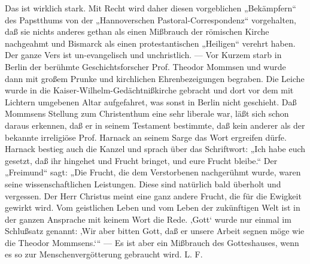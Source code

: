 Das ist wirklich stark. Mit Recht wird daher diesen vorgeblichen „Bekämpfern“ des Papstthums von der „Hannoverschen Pastoral-Correspondenz“ vorgehalten, daß sie nichts anderes gethan als einen Mißbrauch der römischen Kirche nachgeahmt und Bismarck als einen protestantischen „Heiligen“ verehrt haben. Der ganze Vers ist un-evangelisch und unchristlich. — Vor Kurzem starb in Berlin der berühmte Geschichtsforscher Prof. Theodor Mommsen und wurde dann mit großem Prunke und kirchlichen Ehrenbezeigungen begraben. Die Leiche wurde in die Kaiser-Wilhelm-Gedächtnißkirche gebracht und dort vor dem mit Lichtern umgebenen Altar aufgefahret, was sonst in Berlin nicht geschieht. Daß Mommsens Stellung zum Christenthum eine sehr liberale war, läßt sich schon daraus erkennen, daß er in seinem Testament bestimmte, daß kein anderer als der bekannte irreligiöse Prof. Harnack an seinem Sarge das Wort ergreifen dürfe. Harnack bestieg auch die Kanzel und sprach über das Schriftwort: „Ich habe euch gesetzt, daß ihr hingehet und Frucht bringet, und eure Frucht bleibe.“ Der „Freimund“ sagt: „Die Frucht, die dem Verstorbenen nachgerühmt wurde, waren seine wissenschaftlichen Leistungen. Diese sind natürlich bald überholt und vergessen. Der Herr Christus meint eine ganz andere Frucht, die für die Ewigkeit gewirkt wird. Vom geistlichen Leben und vom Leben der zukünftigen Welt ist in der ganzen Ansprache mit keinem Wort die Rede. ‚Gott‘ wurde nur einmal im Schlußsatz genannt: ‚Wir aber bitten Gott, daß er unsere Arbeit segnen möge wie die Theodor Mommsens.‘“ — Es ist aber ein Mißbrauch des Gotteshauses, wenn es so zur Menschenvergötterung gebraucht wird. L. F.

